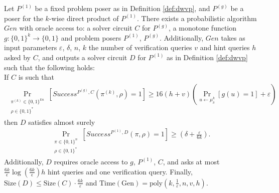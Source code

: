 \begin{theorem}
\label{th:sec_amp_for_dwvp}
Let $P^{(1)}$ be a fixed problem poser as in Definition \ref{def:dwvp}, and $P^{(g)}$ be a poser for the $k$-wise direct product of $P^{(1)}$.
There exists a probabilistic algorithm $Gen$ with oracle access to: a solver circuit $C$ for $P^{(g)}$,
a monotone function $g:\{0,1\}^k \rightarrow \{0,1\}$ and problem posers $P^{(1)}$, $P^{(g)}$.
Additionally, $Gen$ takes as input parameters $\varepsilon$, $\delta$, $n$, $k$
the number of verification queries $v$ and hint queries $h$ asked by $C$, and outputs a solver circuit $D$ for $P^{(1)}$ as in Definition \ref{def:dwvp}
such that the following holds: \\
If $C$ is such that
  \begin{align*}
    \underset{\substack{\pi^{(k)} \in \{0,1\}^{kn} \\ \rho \in \{0,1\}^{*}}}{\Pr}\left[Success^{P^{(g)}, C}(\pi^{(k)}, \rho) = 1\right]
    \geq 16(h+v)\left(\underset{u \leftarrow \mu_\delta^k}{\Pr}\left[g(u) = 1\right] + \varepsilon\right)
  \end{align*}
then $D$ satisfies almost surely
  \begin{align*}
    \underset{\substack{\pi \in \{0,1\}^{n} \\ \rho \in \{0,1\}^{*}}}
    {\Pr}\left[Success^{P^{(1)},D}(\pi, \rho) = 1\right] \geq (\delta + \frac{\varepsilon}{6k}).
  \end{align*}
Additionally, $D$ requires oracle access to $g$, $P^{(1)}$, $C$,
and asks at most $\frac{6k}{\epsilon}\log\left(\frac{6k}{\epsilon}\right) h$ hint queries and one verification query.
Finally, $\text{Size}(D) \leq \text{Size}(C) \cdot \frac{6k}{\varepsilon}$ and $\text{Time}(\text{Gen}) = \text{poly}(k, \frac{1}{\varepsilon}, n, v, h)$.
\end{theorem}
%


